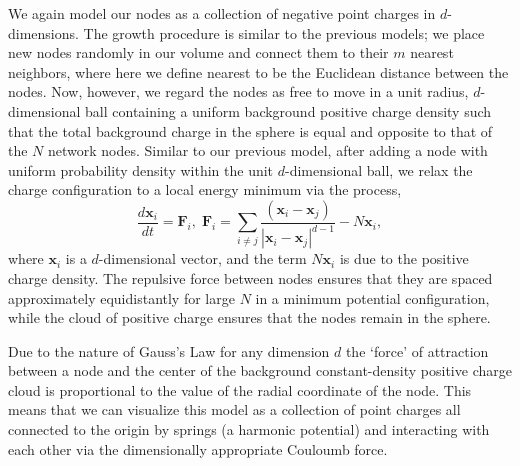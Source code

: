 \documentclass[aps,pre,reprint,superscriptaddress,amsmath,amssymb,nofootinbib]{revtex4-1}
\begin{document}
We again model our nodes as a collection of negative point charges in $d$-dimensions.
The growth procedure is similar to the previous models; we place new nodes randomly in our volume and connect them to their $m$ nearest neighbors, where here we define nearest to be the Euclidean distance between the nodes.
Now, however, we regard the nodes as free to move in a unit radius, $d$-dimensional ball containing a uniform background positive charge density such that the total background charge in the sphere is equal and opposite to that of the $N$ network nodes.
Similar to our previous model, after adding a node with uniform probability density within the unit $d$-dimensional ball, we relax the charge configuration to a local energy minimum via the process,
\begin{equation}
\frac{d\textbf{x}_i}{dt} = \textbf{F}_i,\;
\textbf{F}_i = \sum_{i \neq j} \frac{(\textbf{x}_i - \textbf{x}_j)}{|\textbf{x}_i-\textbf{x}_j|^{d-1}} - N\textbf{x}_i,
\end{equation}
where $\textbf{x}_i$ is a $d$-dimensional vector, and the term $N\textbf{x}_i$ is due to the positive charge density.
The repulsive force between nodes ensures that they are spaced approximately equidistantly for large $N$ in a minimum potential configuration, while the cloud of positive charge ensures that the nodes remain in the sphere.

Due to the nature of Gauss's Law for any dimension $d$ the `force' of attraction between a node and the center of the background constant-density positive charge cloud is proportional to the value of the radial coordinate of the node.
This means that we can visualize this model as a collection of point charges all connected to the origin by springs (a harmonic potential) and interacting with each other via the dimensionally appropriate Couloumb force.  
\end{document}
